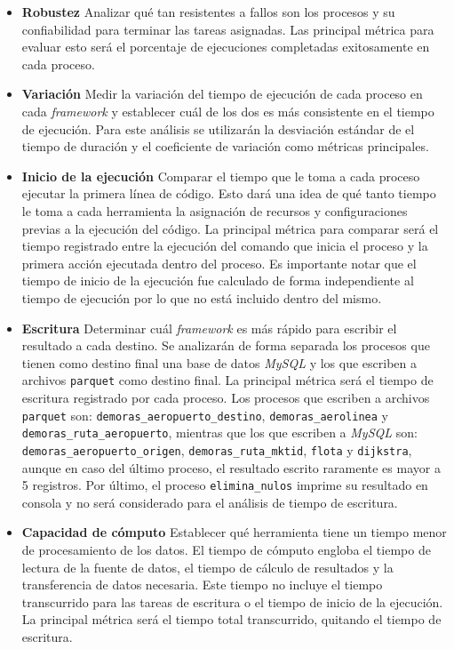 \begin{itemize}
	
	\item \textbf{Robustez} Analizar qué tan resistentes a fallos son los procesos y su confiabilidad para terminar las tareas asignadas. Las principal métrica para evaluar esto será el porcentaje de ejecuciones completadas exitosamente en cada proceso.
	
	\item \textbf{Variación} Medir la variación del tiempo de ejecución de cada proceso en cada \textit{framework} y establecer cuál de los dos es más consistente en el tiempo de ejecución. Para este análisis se utilizarán la desviación estándar de el tiempo de duración y el coeficiente de variación como métricas principales.
	
	\item \textbf{Inicio de la ejecución} Comparar el tiempo que le toma a cada proceso ejecutar la primera línea de código. Esto dará una idea de qué tanto tiempo le toma a cada herramienta la asignación de recursos y configuraciones previas a la ejecución del código. La principal métrica para comparar será el tiempo registrado entre la ejecución del comando que inicia el proceso y la primera acción ejecutada dentro del proceso. Es importante notar que el tiempo de inicio de la ejecución fue calculado de forma independiente al tiempo de ejecución por lo que no está incluido dentro del mismo.
	
	\item \textbf{Escritura} Determinar cuál \textit{framework} es más rápido para escribir el resultado a cada destino. Se analizarán de forma separada los procesos que tienen como destino final una base de datos \textit{MySQL} y los que escriben a archivos \texttt{parquet} como destino final. La principal métrica será el tiempo de escritura registrado por cada proceso. Los procesos que escriben a archivos \texttt{parquet} son: \texttt{demoras\_aeropuerto\_destino}, \texttt{demoras\_aerolinea} y \texttt{demoras\_ruta\_aeropuerto}, mientras que los que escriben a \textit{MySQL} son: \texttt{demoras\_aeropuerto\_origen}, \texttt{demoras\_ruta\_mktid}, \texttt{flota} y \texttt{dijkstra}, aunque en caso del último proceso, el resultado escrito raramente es mayor a 5 registros. Por último, el proceso \texttt{elimina\_nulos} imprime su resultado en consola y no será considerado para el análisis de tiempo de escritura.
	
	\item \textbf{Capacidad de cómputo} Establecer qué herramienta tiene un tiempo menor de procesamiento de los datos. El tiempo de cómputo engloba el tiempo de lectura de la fuente de datos, el tiempo de cálculo de resultados y la transferencia de datos necesaria. Este tiempo no incluye el tiempo transcurrido para las tareas de escritura o el tiempo de inicio de la ejecución. La principal métrica será el tiempo total transcurrido, quitando el tiempo de escritura.
	

\end{itemize}
